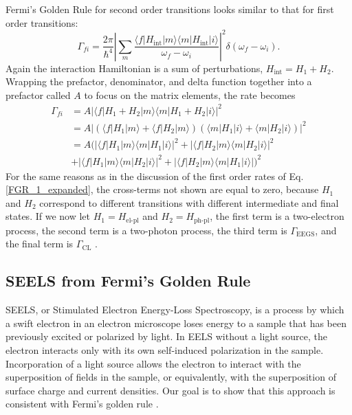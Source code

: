 \documentclass [11pt, proquest] {uwthesis}[2016/11/22]
\begin{document}
Fermi's Golden Rule for second order transitions looks similar to that for first order transitions:
\begin{equation}
\Gamma_{fi} = \frac{2\pi}{\hbar^4}\left|\sum_{m}\frac{\langle f |H_{\textrm{int}}| m \rangle \langle m |H_{\textrm{int}}| i \rangle }{\omega_f-\omega_i}\right|^2 \delta(\omega_f - \omega_i).
\label{FGR_2}
\end{equation}
Again the interaction Hamiltonian is a sum of perturbations, $H_{\textrm{int}} = H_1 + H_2$. Wrapping the prefactor, denominator, and delta function together into a prefactor called $A$ to focus on the matrix elements, the rate becomes
\begin{equation}
\begin{aligned}
\Gamma_{fi} &= A|\langle f |H_1 + H_2| m \rangle \langle m |H_1 + H_2| i \rangle|^2\\
&= A|(\langle f |H_1| m \rangle + \langle f |H_2| m \rangle) (\langle m |H_1| i \rangle + \langle m |H_2| i \rangle)|^2\\
&= A(|\langle f |H_1| m \rangle \langle m |H_1| i \rangle|^2 + |\langle f |H_2| m \rangle \langle m |H_2| i \rangle|^2\\
&+ |\langle f |H_1| m \rangle \langle m |H_2| i \rangle|^2 + |\langle f |H_2| m \rangle \langle m |H_1| i \rangle|)^2
\label{FGR_2_2}
\end{aligned}
\end{equation}
For the same reasons as in the discussion of the first order rates of Eq. \ref{FGR_1_expanded}, the cross-terms not shown are equal to zero, because $H_1$ and $H_2$ correspond to different transitions with different intermediate and final states. If we now let $H_1 = H_\textrm{el-pl}$ and $H_2 = H_{\textrm{ph-pl}}$, the first term is a two-electron process, the second term is a two-photon process, the third term is $\Gamma_{\textrm{EEGS}}$, and the final term is $\Gamma_{\textrm{CL}}$ \cite{EEGS}.

\subsection{SEELS from Fermi's Golden Rule}
SEELS, or Stimulated Electron Energy-Loss Spectroscopy, is a process by which a swift electron in an electron microscope loses energy to a sample that has been previously excited or polarized by light. In EELS without a light source, the electron interacts only with its own self-induced polarization in the sample. Incorporation of a light source allows the electron to interact with the superposition of fields in the sample, or equivalently, with the superposition of surface charge and current densities. Our goal is to show that this approach is consistent with Fermi's golden rule \cite{vanAiken,EEGS}.
\end{document}
